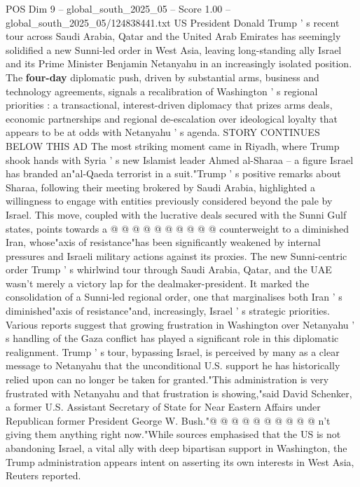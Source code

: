 \begin{textsample}{POS Dim 9 – global\_south\_2025\_05 – Score 1.00 – global\_south\_2025\_05/124838441.txt}  \label{ex:f9_pos_209}
US President Donald Trump ' s recent tour across Saudi Arabia, Qatar and the United Arab Emirates has seemingly solidified a new Sunni-led order in West Asia, leaving long-standing ally Israel and its Prime Minister Benjamin Netanyahu in an increasingly isolated position.
The \textbf{four-day} diplomatic push, driven by substantial arms, business and technology agreements, signals a recalibration of Washington ' s regional priorities : a transactional, interest-driven diplomacy that prizes arms deals, economic partnerships and regional de-escalation over ideological loyalty that appears to be at odds with Netanyahu ' s agenda.
STORY CONTINUES BELOW THIS AD The most striking moment came in Riyadh, where Trump shook hands with Syria ' s new Islamist leader Ahmed al-Sharaa -- a figure Israel has branded an"al-Qaeda terrorist in a suit."Trump ' s positive remarks about Sharaa, following their meeting brokered by Saudi Arabia, highlighted a willingness to engage with entities previously considered beyond the pale by Israel.
This move, coupled with the lucrative deals secured with the Sunni Gulf states, points towards a @ @ @ @ @ @ @ @ @ @ counterweight to a diminished Iran, whose"axis of resistance"has been significantly weakened by internal pressures and Israeli military actions against its proxies.
The new Sunni-centric order Trump ' s whirlwind tour through Saudi Arabia, Qatar, and the UAE wasn't merely a victory lap for the dealmaker-president.
It marked the consolidation of a Sunni-led regional order, one that marginalises both Iran ' s diminished"axis of resistance"and, increasingly, Israel ' s strategic priorities.
Various reports suggest that growing frustration in Washington over Netanyahu ' s handling of the Gaza conflict has played a significant role in this diplomatic realignment.
Trump ' s tour, bypassing Israel, is perceived by many as a clear message to Netanyahu that the unconditional U.S. support he has historically relied upon can no longer be taken for granted."This administration is very frustrated with Netanyahu and that frustration is showing,"said David Schenker, a former U.S.
Assistant Secretary of State for Near Eastern Affairs under Republican former President George W.
Bush."@ @ @ @ @ @ @ @ @ @ n't giving them anything right now."While sources emphasised that the US is not abandoning Israel, a vital ally with deep bipartisan support in Washington, the Trump administration appears intent on asserting its own interests in West Asia, Reuters reported.

\end{textsample}
